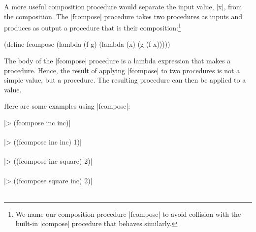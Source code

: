 \begin{schemeregion}
A more useful composition procedure would separate the input value, \scheme|x|, from the composition.  The \scheme|fcompose| procedure takes two procedures as inputs and produces as output a procedure that is their composition:\footnote{We name our composition procedure \scheme|fcompose| to avoid collision with the built-in \scheme|compose| procedure that behaves similarly.}
\begin{schemedisplay}
(define fcompose
   (lambda (f g) (lambda (x) (g (f x)))))
\end{schemedisplay}
The body of the \scheme|fcompose| procedure is a lambda expression that makes a procedure.  Hence, the result of applying \scheme|fcompose| to two procedures is not a simple value, but a procedure.  The resulting procedure can then be applied to a value.

Here are some examples using \scheme|fcompose|:
\begin{code}
\scheme|> (fcompose inc inc)|\\
\\
\scheme|> ((fcompose inc inc) 1)|\\
\\
\scheme|> ((fcompose inc square) 2)|\\
\\
\scheme|> ((fcompose square inc) 2)|\\
\\
\end{code}


\end{schemeregion}
